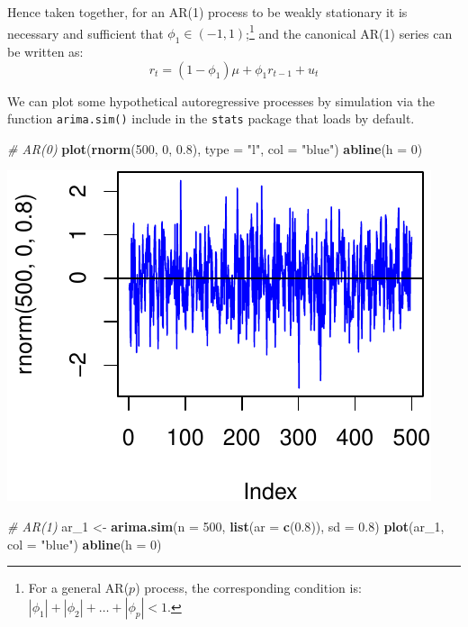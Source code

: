\documentclass[11pt,]{article}
\newenvironment{Shaded}{\begin{snugshade}}{\end{snugshade}}
\newcommand{\KeywordTok}[1]{\textcolor[rgb]{0.13,0.29,0.53}{\textbf{#1}}}
\newcommand{\DataTypeTok}[1]{\textcolor[rgb]{0.13,0.29,0.53}{#1}}
\newcommand{\DecValTok}[1]{\textcolor[rgb]{0.00,0.00,0.81}{#1}}
\newcommand{\FloatTok}[1]{\textcolor[rgb]{0.00,0.00,0.81}{#1}}
\newcommand{\StringTok}[1]{\textcolor[rgb]{0.31,0.60,0.02}{#1}}
\newcommand{\CommentTok}[1]{\textcolor[rgb]{0.56,0.35,0.01}{\textit{#1}}}
\newcommand{\NormalTok}[1]{#1}
\let\rmarkdownfootnote\footnote%
\def\footnote{\protect\rmarkdownfootnote}
\begin{document}
Hence taken together, for an AR(1) process to be weakly stationary it is
necessary and sufficient that \(\phi_1\in(-1,1)\);\footnote{For a
  general AR(\(p\)) process, the corresponding condition is:
  \(|\phi_1|+|\phi_2|+\hdots+|\phi_p|<1\).} and the canonical AR(1)
series can be written as: \[r_t=(1-\phi_1)\mu+\phi_1r_{t-1}+u_t\]

We can plot some hypothetical autoregressive processes by simulation via
the function \texttt{arima.sim()} include in the \texttt{stats} package
that loads by default.

\begin{Shaded}
\begin{Highlighting}[]
\CommentTok{# AR(0)}
\KeywordTok{plot}\NormalTok{(}\KeywordTok{rnorm}\NormalTok{(}\DecValTok{500}\NormalTok{, }\DecValTok{0}\NormalTok{, }\FloatTok{0.8}\NormalTok{), }\DataTypeTok{type =} \StringTok{"l"}\NormalTok{, }\DataTypeTok{col =} \StringTok{"blue"}\NormalTok{)}
\KeywordTok{abline}\NormalTok{(}\DataTypeTok{h =} \DecValTok{0}\NormalTok{)}
\end{Highlighting}
\end{Shaded}

\begin{center}\includegraphics{FMC_T4_PhD_ARMA_GARCH_files/figure-latex/arima_sim-1} \end{center}

\begin{Shaded}
\begin{Highlighting}[]
\CommentTok{# AR(1)}
\NormalTok{ar_}\DecValTok{1}\NormalTok{ <-}\StringTok{ }\KeywordTok{arima.sim}\NormalTok{(}\DataTypeTok{n =} \DecValTok{500}\NormalTok{, }\KeywordTok{list}\NormalTok{(}\DataTypeTok{ar =} \KeywordTok{c}\NormalTok{(}\FloatTok{0.8}\NormalTok{)), }\DataTypeTok{sd =} \FloatTok{0.8}\NormalTok{)}
\KeywordTok{plot}\NormalTok{(ar_}\DecValTok{1}\NormalTok{, }\DataTypeTok{col =} \StringTok{"blue"}\NormalTok{)}
\KeywordTok{abline}\NormalTok{(}\DataTypeTok{h =} \DecValTok{0}\NormalTok{)}
\end{Highlighting}
\end{Shaded}
\end{document}
